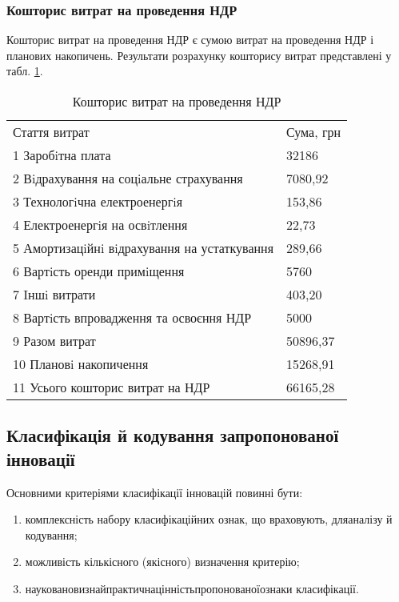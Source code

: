 \subsubsection{Кошторис витрат на проведення НДР}

Кошторис витрат на проведення НДР є сумою витрат на проведення НДР і планових накопичень. Результати розрахунку кошторису витрат представлені у табл. \ref{tab:sumNDR}.

\newpage

\begin{table}[hbt]
	\captionstyle{ \raggedright}
	\caption{Кошторис витрат на проведення НДР}\label{tab:sumNDR}
	\begin{tabular}{|p{}|p{}|}
		\hline
		Стаття витрат & Сума, грн \\
		\hlinewd{2pt}
		1 Заробiтна плата & 32186  \\
		\hline
		2 Вiдрахування на соцiальне страхування & 7080,92 \\
		\hline
		3 Технологiчна електроенергiя & 153,86 \\
		\hline
		4 Електроенергiя на освiтлення & 22,73 \\
		\hline
		5 Амортизацiйнi вiдрахування на устаткування & 289,66 \\
		\hline
		6 Вартiсть оренди примiщення & 5760 \\
		\hline
		7 Iншi витрати & 403,20 \\
		\hline
		8 Вартiсть впровадження та освоєння НДР & 5000 \\
		\hline
		9 Разом витрат & 50896,37 \\
		\hline
		10 Плановi накопичення & 15268,91 \\
		\hline
		11 Усього кошторис витрат на НДР & 66165,28  \\
		\hline
	\end{tabular}
\end{table}

\subsection{Класифікація й кодування запропонованої інновації}

Основними критеріями класифікації інновацій повинні бути:

\begin{enumerate}
	\item комплексність набору класифікаційних ознак, що враховують, для\newline \hspace*{-18mm}аналізу й кодування;
	\item можливість кількісного (якісного) визначення критерію;
	\item наукова\hfill новизна\hfill й\hfill практична\hfill цінність\hfill пропонованої\hfill ознаки\newline \hspace*{-20mm} класифікації.
\end{enumerate}

